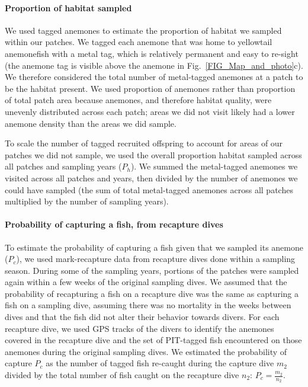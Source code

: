 \documentclass[12pt, oneside]{article}   	%
\begin{document}
\paragraph{Proportion of habitat sampled} \label{APP_SEC_ProbHabSampled}

We used tagged anemones to estimate the proportion of habitat we sampled within our patches. We tagged each anemone that was home to yellowtail anemonefish with a metal tag, which is relatively permanent and easy to re-sight (the anemone tag is visible above the anemone in Fig.\ \ref{FIG_Map_and_photo}c). We therefore considered the total number of metal-tagged anemones at a patch to be the habitat present. We used proportion of anemones rather than proportion of total patch area because anemones, and therefore habitat quality, were unevenly distributed across each patch; areas we did not visit likely had a lower anemone density than the areas we did sample. %

To scale the number of tagged recruited offspring to account for areas of our patches we did not sample, we used the overall proportion habitat sampled across all patches and sampling years ($P_h$). We summed the metal-tagged anemones we visited across all patches and years, then divided by the number of anemones we could have sampled (the sum of total metal-tagged anemones across all patches multiplied by the number of sampling years).

\paragraph{Probability of capturing a fish, from recapture dives} \label{APP_SEC_ProbR}

To estimate the probability of capturing a fish given that we sampled its anemone ($P_c$), we used mark-recapture data from recapture dives done within a sampling season. During some of the sampling years, portions of the patches were sampled again within a few weeks of the original sampling dives. We assumed that the probability of recapturing a fish on a recapture dive was the same as capturing a fish on a sampling dive, assuming there was no mortality in the weeks between dives and that the fish did not alter their behavior towards divers. For each recapture dive, we used GPS tracks of the divers to identify the anemones covered in the recapture dive and the set of PIT-tagged fish encountered on those anemones during the original sampling dives. We estimated the probability of capture $P_c$ as the number of tagged fish re-caught during the capture dive $m_2$ divided by the total number of fish caught on the recapture dive $n_2$: $P_c = \frac{m_2}{n_2}$. %
\end{document}
